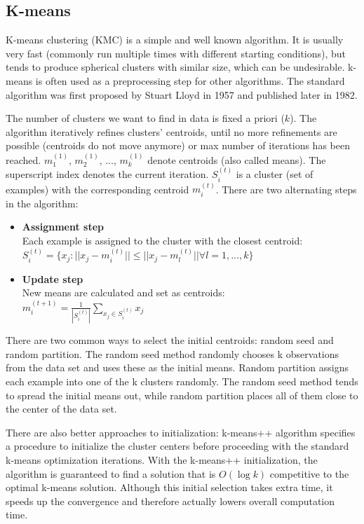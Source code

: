 \documentclass[conference]{IEEEtran}
\begin{document}
\subsection{K-means}
K-means clustering (KMC) is a simple and well known algorithm. It is usually very
fast (commonly run multiple times with different starting conditions), but tends
to produce spherical clusters with similar size, which can be undesirable.
k-means is often used as a preprocessing step for other algorithms. The standard
algorithm was first proposed by Stuart Lloyd in 1957 and published later in 1982.

The number of clusters we want to find in data is fixed a priori ($k$).
The algorithm iteratively refines clusters' centroids,
until no more refinements are possible (centroids do not move anymore)
or max number of iterations has been reached. $m_1^{(1)}$, $m_2^{(1)}$, ..., $m_k^{(1)}$
denote centroids (also called means). The superscript index denotes the current iteration.
$S_i^{(t)}$ is a cluster (set of examples) with the corresponding centroid $m_i^{(t)}$.
There are two alternating steps in the algorithm:

\begin{itemize}
\item \textbf{Assignment step}\\
  Each example is assigned to the cluster with the closest centroid:\\
  $S_i^{(t)} = \{x_j : ||x_j - m_i^{(t)}|| \le ||x_j - m_l^{(t)}|| \forall l = 1, ..., k\}$
\\
\item \textbf{Update step}\\
  New means are calculated and set as centroids:\\
  $m_i^{(t+1)} = \frac{1}{|S_i^{(t)}|} \displaystyle\sum\limits_{x_j \in S_i^{(t)}}{x_j}$
\end{itemize}

There are two common ways to select the initial centroids: random seed and random partition.
The random seed method randomly chooses k observations from the data set
and uses these as the initial means. Random partition
assigns each example into one of the k clusters randomly.
The random seed method tends to spread the initial means out, while random partition
places all of them close to the center of the data set.

There are also better approaches to initialization: k-means++ algorithm specifies a
procedure to initialize the cluster centers before proceeding with the standard k-means
optimization iterations. With the k-means++ initialization, the algorithm is guaranteed
to find a solution that is $O(\log k)$ competitive to the optimal k-means solution.
Although this initial selection takes extra time, it speeds up the convergence and 
therefore actually lowers overall computation time.
\end{document}
